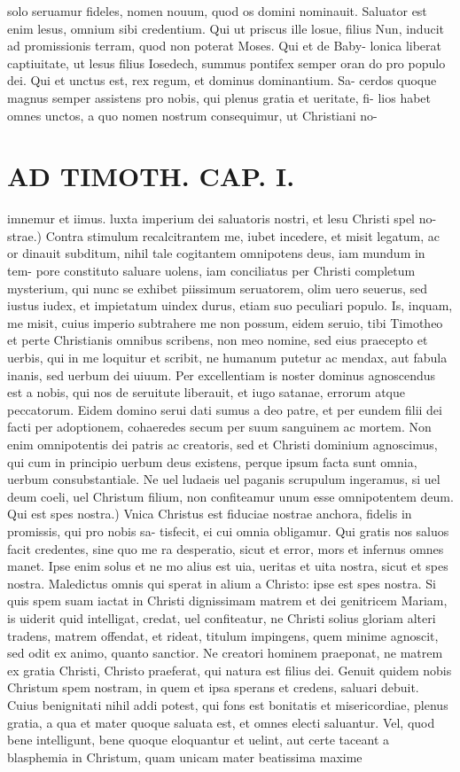 \documentclass{article}
\begin{document}
\begin{pages}
solo seruamur fideles, nomen nouum, quod os domini nominauit. Saluator est enim lesus, omnium sibi credentium. Qui ut priscus ille losue, filius Nun, inducit ad promissionis terram, quod non poterat Moses. Qui et de Baby- lonica liberat captiuitate, ut lesus filius Iosedech, summus pontifex semper oran do pro populo dei. Qui et unctus est, rex regum, et dominus dominantium. Sa- cerdos quoque magnus semper assistens pro nobis, qui plenus gratia et ueritate, fi- lios habet omnes unctos, a quo nomen nostrum consequimur, ut Christiani no-  \pend
\section*{AD TIMOTH. CAP. I. }
\marginpar{[ p.465 ]}\pstart imnemur et iimus. luxta imperium dei saluatoris nostri, et lesu Christi spel no- strae.) Contra stimulum recalcitrantem me, iubet incedere, et misit legatum, ac or dinauit subditum, nihil tale cogitantem omnipotens deus, iam mundum in tem- pore constituto saluare uolens, iam conciliatus per Christi completum mysterium, qui nunc se exhibet piissimum seruatorem, olim uero seuerus, sed iustus iudex, et impietatum uindex durus, etiam suo peculiari populo. Is, inquam, me misit, cuius imperio subtrahere me non possum, eidem seruio, tibi Timotheo et perte Christianis omnibus scribens, non meo nomine, sed eius praecepto et uerbis, qui in me loquitur et scribit, ne humanum putetur ac mendax, aut fabula inanis, sed uerbum dei uiuum. Per excellentiam is noster dominus agnoscendus est a nobis, qui nos de seruitute liberauit, et iugo satanae, errorum atque peccatorum. Eidem domino serui dati sumus a deo patre, et per eundem filii dei facti per adoptionem, cohaeredes secum per suum sanguinem ac mortem. Non enim omnipotentis dei patris ac creatoris, sed et Christi dominium agnoscimus, qui cum in principio uerbum deus existens, perque ipsum facta sunt omnia, uerbum consubstantiale. Ne uel ludaeis uel paganis scrupulum ingeramus, si uel deum coeli, uel Christum filium, non confiteamur unum esse omnipotentem deum. Qui est spes nostra.) Vnica Christus est fiduciae nostrae anchora, fidelis in promissis, qui pro nobis sa- tisfecit, ei cui omnia obligamur. Qui gratis nos saluos facit credentes, sine quo me ra desperatio, sicut et error, mors et infernus omnes manet. Ipse enim solus et ne mo alius est uia, ueritas et uita nostra, sicut et spes nostra. Maledictus omnis qui sperat in alium a Christo: ipse est spes nostra. Si quis spem suam iactat in Christi dignissimam matrem et dei genitricem Mariam, is uiderit quid intelligat, credat, uel confiteatur, ne Christi solius gloriam alteri tradens, matrem offendat, et rideat, titulum impingens, quem minime agnoscit, sed odit ex animo, quanto sanctior. Ne creatori hominem praeponat, ne matrem ex gratia Christi, Christo praeferat, qui natura est filius dei. Genuit quidem nobis Christum spem nostram, in quem et ipsa sperans et credens, saluari debuit. Cuius benignitati nihil addi potest, qui fons est bonitatis et misericordiae, plenus gratia, a qua et mater quoque saluata est, et omnes electi saluantur. Vel, quod bene intelligunt, bene quoque eloquantur et uelint, aut certe taceant a blasphemia in Christum, quam unicam mater beatissima maxime 
\end{pages}
\end{document}
